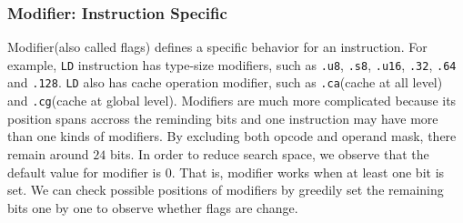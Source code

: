 \subsubsection{Modifier: Instruction Specific}

Modifier(also called flags) defines a specific behavior for an instruction. For example,
{\tt LD} instruction has type-size modifiers, such as {\tt .u8}, {\tt .s8}, {\tt .u16}, {\tt .32}, {\tt .64} and {\tt .128}. {\tt LD} also has cache operation modifier, such as {\tt .ca}(cache at all level) and {\tt .cg}(cache at global level). Modifiers are much more complicated because its position spans accross the reminding bits and one instruction may have more than one kinds of modifiers. By excluding both opcode and operand mask, there remain around $24$ bits. In order to reduce search space, we observe that the default value for modifier is $0$. That is, modifier works when at least one bit is set. We can check possible positions of modifiers by greedily set the remaining bits one by one to observe whether flags are change.


